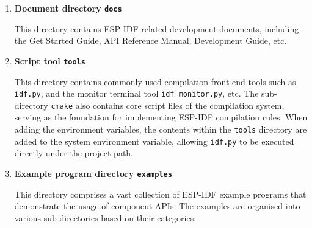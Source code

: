 \documentclass[a4paper,12pt]{book}
\begin{document}
\begin{enumerate}[label=(\arabic*),leftmargin=2em]
\begin{enumerate}[label=\textbf{\alph*.},leftmargin=0em]
        \item \textbf{Document directory \texttt{docs}}

        This directory contains ESP-IDF related development documents, including the Get Started Guide, API Reference Manual, Development Guide, etc.


        \item \textbf{Script tool \texttt{tools}}

        This directory contains commonly used compilation front-end tools such as \verb|idf.py|, and the monitor terminal tool \verb|idf_monitor.py|, etc. The sub-directory \verb|cmake| also contains core script files of the compilation system, serving as the foundation for implementing ESP-IDF compilation rules. When adding the environment variables, the contents within the \verb|tools| directory are added to the system environment variable, allowing \verb|idf.py| to be executed directly under the project path.

        \item \textbf{Example program directory \texttt{examples}}

        This directory comprises a vast collection of ESP-IDF example programs that demonstrate the usage of component APIs. The examples are organised into various sub-directories based on their categories:


\end{enumerate}
\end{enumerate}
\end{document}
